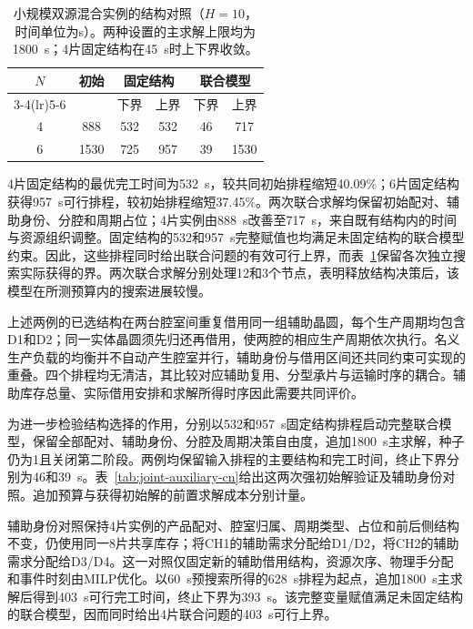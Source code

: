 \documentclass[final,5p,times,twocolumn]{elsarticle}
\begin{document}
\begin{table}[!t]
\centering\scriptsize\setlength{\tabcolsep}{3pt}
\caption{小规模双源混合实例的结构对照（$H=10$，时间单位为s）。两种设置的主求解上限均为1800~s；4片固定结构在45~s时上下界收敛。}
\label{tab:joint-small-cn}
\begin{tabular}{cccccc}\toprule
\multirow{2}{*}{$N$} & \multirow{2}{*}{初始} & \multicolumn{2}{c}{固定结构} & \multicolumn{2}{c}{联合模型}\\
\cmidrule(lr){3-4}\cmidrule(lr){5-6}
 & & 下界 & 上界 & 下界 & 上界\\\midrule
4 & 888 & 532 & 532 & 46 & 717\\
6 & 1530 & 725 & 957 & 39 & 1530\\
\bottomrule\end{tabular}\end{table}

4片固定结构的最优完工时间为532~s，较共同初始排程缩短40.09\%；6片固定结构获得957~s可行排程，较初始排程缩短37.45\%。两次联合求解均保留初始配对、辅助身份、分腔和周期占位；4片实例由888~s改善至717~s，来自既有结构内的时间与资源组织调整。固定结构的532和957~s完整赋值也均满足未固定结构的联合模型约束。因此，这些排程同时给出联合问题的有效可行上界，而表~\ref{tab:joint-small-cn}保留各次独立搜索实际获得的界。两次联合求解分别处理12和3个节点，表明释放结构决策后，该模型在所测预算内的搜索进展较慢。

上述两例的已选结构在两台腔室间重复借用同一组辅助晶圆，每个生产周期均包含D1和D2；同一实体晶圆须先归还再借用，使两腔的相应生产周期依次执行。名义生产负载的均衡并不自动产生腔室并行，辅助身份与借用区间还共同约束可实现的重叠。四个排程均无清洁，其比较对应辅助复用、分型承片与运输时序的耦合。辅助库存总量、实际借用安排和求解所得时序因此需要共同评价。

为进一步检验结构选择的作用，分别以532和957~s固定结构排程启动完整联合模型，保留全部配对、辅助身份、分腔及周期决策自由度，追加1800~s主求解，种子仍为1且关闭第二阶段。两例均保留输入排程的主要结构和完工时间，终止下界分别为46和39~s。表~\ref{tab:joint-auxiliary-cn}给出这两次强初始解验证及辅助身份对照。追加预算与获得初始解的前置求解成本分别计量。

辅助身份对照保持4片实例的产品配对、腔室归属、周期类型、占位和前后侧结构不变，仍使用同一8片共享库存；将CH1的辅助需求分配给D1/D2，将CH2的辅助需求分配给D3/D4。这一对照仅固定新的辅助借用结构，资源次序、物理手分配和事件时刻由MILP优化。以60~s预搜索所得的628~s排程为起点，追加1800~s主求解后得到403~s可行完工时间，终止下界为393~s。该完整变量赋值满足未固定结构的联合模型，因而同时给出4片联合问题的403~s可行上界。
\end{document}
